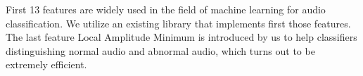 First 13 features are widely used in the field of machine learning for audio classification. We utilize an existing library\cite{b6} that implements first those features. The last feature Local Amplitude Minimum is introduced by us to help classifiers distinguishing normal audio and abnormal audio, which turns out to be extremely efficient.